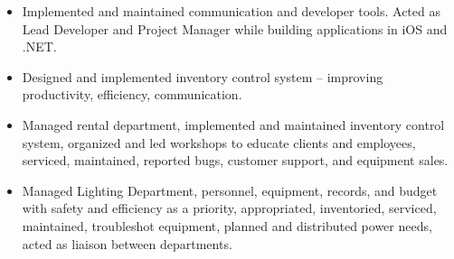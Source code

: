 \documentclass[letterpaper]{article}        %
\begin{document}
    \begin{itemize}
    \item Implemented and maintained communication and developer tools.  Acted as Lead Developer and Project Manager while building applications in iOS and .NET.
    \end{itemize}
  
    \begin{itemize}
    \item Designed and implemented inventory control system -- improving productivity, efficiency, communication.
    \end{itemize}
  
    \begin{itemize}
    \item Managed rental department, implemented and maintained inventory control system, organized and led workshops to educate clients and employees, serviced, maintained, reported bugs, customer support, and equipment sales.
    \end{itemize}
  
    \begin{itemize}
    \item Managed Lighting Department, personnel, equipment, records, and budget with safety and efficiency as a priority, appropriated, inventoried, serviced, maintained, troubleshot equipment, planned and distributed power needs, acted as liaison between departments.
    \end{itemize}

\end{document}
